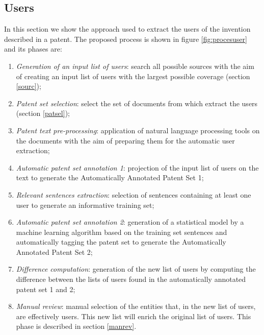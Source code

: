 \documentclass[]{book}
\begin{document}
\subsection{Users}\label{users}

In this section we show the approach used to extract the users of the
invention described in a patent. The proposed process is shown in figure
\ref{fig:procesuser} and its phases are:

\begin{enumerate}
\def\labelenumi{\arabic{enumi}.}
\item
  \emph{Generation of an input list of users}: search all possible
  sources with the aim of creating an input list of users with the
  largest possible coverage (section \ref{sourc});
\item
  \emph{Patent set selection}: select the set of documents from which
  extract the users (section \ref{patsel});
\item
  \emph{Patent text pre-processing}: application of natural language
  processing tools on the documents with the aim of preparing them for
  the automatic user extraction;
\item
  \emph{Automatic patent set annotation 1}: projection of the input list
  of users on the text to generate the Automatically Annotated Patent
  Set 1;
\item
  \emph{Relevant sentences extraction}: selection of sentences
  containing at least one user to generate an informative training set;
\item
  \emph{Automatic patent set annotation 2}: generation of a statistical
  model by a machine learning algorithm based on the training set
  sentences and automatically tagging the patent set to generate the
  Automatically Annotated Patent Set 2;
\item
  \emph{Difference computation}: generation of the new list of users by
  computing the difference between the lists of users found in the
  automatically annotated patent set 1 and 2;
\item
  \emph{Manual review}: manual selection of the entities that, in the
  new list of users, are effectively users. This new list will enrich
  the original list of users. This phase is described in section
  \ref{manrev}.
\end{enumerate}
\end{document}
